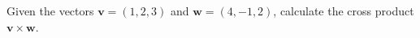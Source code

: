 \question[10] Given the vectors $\mathbf{v} = (1, 2, 3)$ and $\mathbf{w} = (4, -1, 2)$, calculate the cross product $\mathbf{v} \times \mathbf{w}$.
